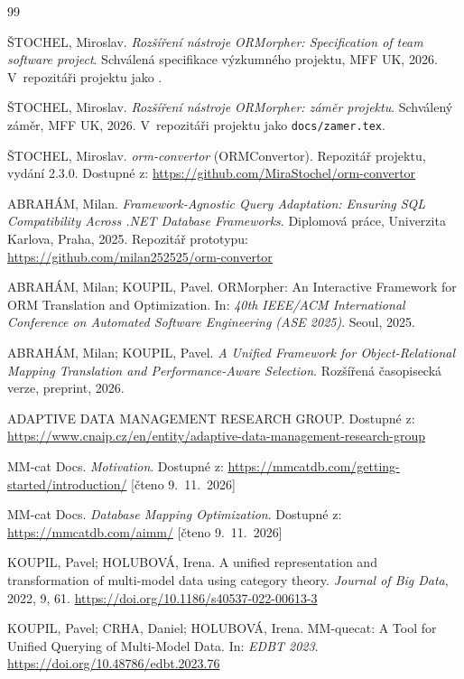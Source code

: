 \documentclass{article}
\begin{document}
\begin{thebibliography}{99}

ŠTOCHEL, Miroslav. \emph{Rozšíření nástroje ORMorpher: Specification of team software project}. Schválená specifikace výzkumného projektu, MFF UK, 2026. V~repozitáři projektu jako .

ŠTOCHEL, Miroslav. \emph{Rozšíření nástroje ORMorpher: záměr projektu}. Schválený záměr, MFF UK, 2026. V~repozitáři projektu jako \texttt{docs/zamer.tex}.

ŠTOCHEL, Miroslav. \emph{orm-convertor} (ORMConvertor). Repozitář projektu, vydání 2.3.0. Dostupné z: \url{https://github.com/MiraStochel/orm-convertor}

ABRAHÁM, Milan. \emph{Framework-Agnostic Query Adaptation: Ensuring SQL Compatibility Across .NET Database Frameworks}. Diplomová práce, Univerzita Karlova, Praha, 2025. Repozitář prototypu: \url{https://github.com/milan252525/orm-convertor}

ABRAHÁM, Milan; KOUPIL, Pavel. ORMorpher: An Interactive Framework for ORM Translation and Optimization. In: \emph{40th IEEE/ACM International Conference on Automated Software Engineering (ASE 2025)}. Seoul, 2025.

ABRAHÁM, Milan; KOUPIL, Pavel. \emph{A Unified Framework for Object-Relational Mapping Translation and Performance-Aware Selection}. Rozšířená časopisecká verze, preprint, 2026.

ADAPTIVE DATA MANAGEMENT RESEARCH GROUP. Dostupné z: \url{https://www.cnaip.cz/en/entity/adaptive-data-management-research-group}

MM-cat Docs. \emph{Motivation}. Dostupné z: \url{https://mmcatdb.com/getting-started/introduction/} [čteno 9.~11.~2026]

MM-cat Docs. \emph{Database Mapping Optimization}. Dostupné z: \url{https://mmcatdb.com/aimm/} [čteno 9.~11.~2026]

KOUPIL, Pavel; HOLUBOVÁ, Irena. A unified representation and transformation of multi-model data using category theory. \emph{Journal of Big Data}, 2022, 9, 61. \url{https://doi.org/10.1186/s40537-022-00613-3}

KOUPIL, Pavel; CRHA, Daniel; HOLUBOVÁ, Irena. MM-quecat: A Tool for Unified Querying of Multi-Model Data. In: \emph{EDBT 2023}. \url{https://doi.org/10.48786/edbt.2023.76}


\end{thebibliography}
\end{document}
